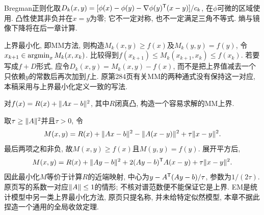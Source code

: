Bregman正则化取$D_k(x,y)=[\phi(x)-\phi(y)-\nabla\phi(y)^{\mathsf T}(x-y)]/c_k$, 在$\phi$可微的区域使用. 凸性使其非负并在$x=y$为零; 它不一定对称, 也不一定满足三角不等式. 熵与镜像下降将在后一章计算.

上界最小化, 即MM方法, 则构造$M_k(x,y)\ge f(x)$及$M_k(y,y)=f(y)$, 令$x_{k+1}\in\operatorname{argmin}_x M_k(x,x_k)$. 比较得到$f(x_{k+1})\le M_k(x_{k+1},x_k)\le f(x_k)$. 若要写成$f+D$形式, 应令$D_k(x,y)=M_k(x,y)-f(x)$, 而不是把上界值减去一个只依赖$y$的常数后再次加到$f$上. 原第284页有关MM的两种通式没有保持这一对应, 本稿采用与上界最小化定义一致的写法.

\begin{example}
对$f(x)=R(x)+\lVert Ax-b\rVert^2$, 其中$R$闭真凸, 构造一个容易求解的MM上界.
\end{example}
\begin{solution}
取$\tau\ge\lVert A\rVert^2$并且$\tau>0$, 令
\[
 M(x,y)=R(x)+\lVert Ax-b\rVert^2-\lVert A(x-y)\rVert^2+\tau\lVert x-y\rVert^2.
\]
最后两项之和非负, 故$M(x,y)\ge f(x)$且$M(y,y)=f(y)$. 展开平方后,
\[
 M(x,y)=R(x)+\lVert Ay-b\rVert^2+2(Ay-b)^{\mathsf T} A(x-y)+\tau\lVert x-y\rVert^2.
\]
因此最小化$M$等价于计算$R$的近端映射, 中心为$y-A^{\mathsf T}(Ay-b)/\tau$, 参数为$1/(2\tau)$. 原页写的系数一对应$\lVert A\rVert\le1$的情形; 不核对谱范数便不能保证它是上界. EM是统计模型中另一类上界最小化方法, 原页只提名称, 并未给特定似然模型, 本章不据此捏造一个通用的全局收敛定理.
\end{solution}
